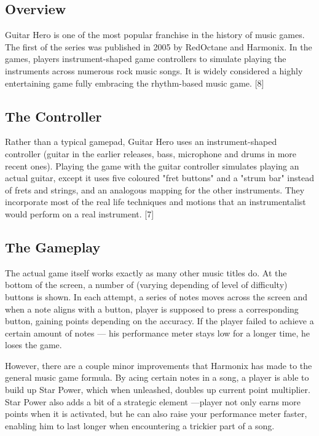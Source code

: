 \subsection{Overview}

Guitar Hero is one of the most popular franchise in the history of music games. The first of the series was published in 2005 by RedOctane and Harmonix. In the games, players instrument-shaped game controllers to simulate playing the instruments across numerous rock music songs. It is widely considered a highly entertaining game fully embracing the rhythm-based music game. [8]


\subsection{The Controller}

Rather than a typical gamepad, Guitar Hero uses an instrument-shaped controller (guitar in the earlier releases, bass, microphone and drums in more recent ones). Playing the game with the guitar controller simulates playing an actual guitar, except it uses five coloured "fret buttons" and a "strum bar" instead of frets and strings, and an analogous mapping for the other instruments. They incorporate most of the real life techniques and motions that an instrumentalist would perform on a real instrument. [7]


\subsection{The Gameplay}

The actual game itself works exactly as many other music titles do. At the bottom of the screen, a number of (varying depending of level of difficulty) buttons is shown. In each attempt, a series of notes moves across the screen and when a note aligns with a button, player is supposed to press a corresponding button, gaining points depending on the accuracy. If the player failed to achieve a certain amount of notes — his performance meter stays low for a longer time, he loses the game.

However, there are a couple minor improvements that Harmonix has made to the general music game formula. By acing certain notes in a song, a player is able to build up Star Power, which when unleashed, doubles up current point multiplier. Star Power also adds a bit of a strategic element —player not only earns more points when it is activated, but he can also raise your performance meter faster, enabling him to last longer when encountering a trickier part of a song.


